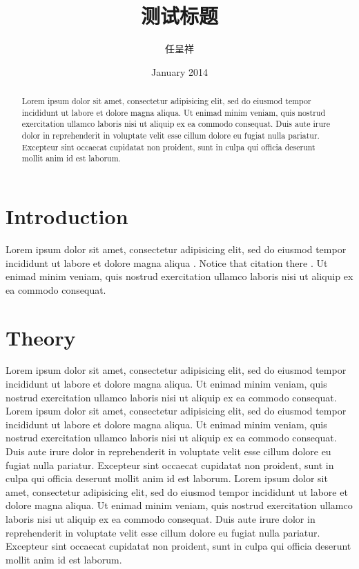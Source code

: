 \documentclass[]{article}
\title{测试标题}
\author{任呈祥}
\date{January 2014}
\begin{document}
\maketitle
\begin{abstract}
Lorem ipsum dolor sit amet, consectetur adipisicing elit, sed do eiusmod
tempor incididunt ut labore et dolore magna aliqua. Ut enimad minim
veniam, quis nostrud exercitation ullamco laboris nisi ut aliquip ex ea
commodo consequat. Duis aute irure dolor in reprehenderit in voluptate
velit esse cillum dolore eu fugiat nulla pariatur. Excepteur sint
occaecat cupidatat non proident, sunt in culpa qui officia deserunt
mollit anim id est laborum.
\end{abstract}

{
\hypersetup{linkcolor=black}
\setcounter{tocdepth}{3}
\tableofcontents
}
\section{Introduction}\label{introduction}

Lorem ipsum dolor sit amet, consectetur adipisicing elit, sed do eiusmod
tempor incididunt ut labore et dolore magna aliqua
\autocite{menni2002topological}. Notice that citation there
\autocite{Hu1984bourbaki}. Ut enimad minim veniam, quis nostrud
exercitation ullamco laboris nisi ut aliquip ex ea commodo consequat.

\section{Theory}\label{theory}

Lorem ipsum dolor sit amet, consectetur adipisicing elit, sed do eiusmod
tempor incididunt ut labore et dolore magna aliqua. Ut enimad minim
veniam, quis nostrud exercitation ullamco laboris nisi ut aliquip ex ea
commodo consequat. Lorem ipsum dolor sit amet, consectetur adipisicing
elit, sed do eiusmod tempor incididunt ut labore et dolore magna aliqua.
Ut enimad minim veniam, quis nostrud exercitation ullamco laboris nisi
ut aliquip ex ea commodo consequat. Duis aute irure dolor in
reprehenderit in voluptate velit esse cillum dolore eu fugiat nulla
pariatur. Excepteur sint occaecat cupidatat non proident, sunt in culpa
qui officia deserunt mollit anim id est laborum. Lorem ipsum dolor sit
amet, consectetur adipisicing elit, sed do eiusmod tempor incididunt ut
labore et dolore magna aliqua. Ut enimad minim veniam, quis nostrud
exercitation ullamco laboris nisi ut aliquip ex ea commodo consequat.
Duis aute irure dolor in reprehenderit in voluptate velit esse cillum
dolore eu fugiat nulla pariatur. Excepteur sint occaecat cupidatat non
proident, sunt in culpa qui officia deserunt mollit anim id est laborum.
\end{document}
